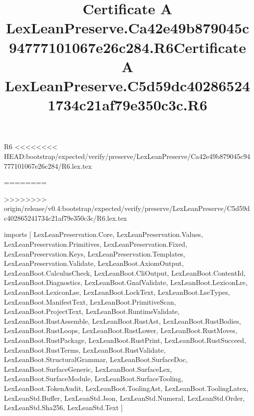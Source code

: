 \begin{lexlean}{R6}
<<<<<<<< HEAD:bootstrap/expected/verify/preserve/LexLeanPreserve/Ca42e49b879045c94777101067e26c284/R6.lex.tex
\title{Certificate A LexLeanPreserve.Ca42e49b879045c94777101067e26c284.R6}
========
\title{Certificate A LexLeanPreserve.C5d59dc402865241734c21af79e350c3c.R6}
>>>>>>>> origin/release/v0.4:bootstrap/expected/verify/preserve/LexLeanPreserve/C5d59dc402865241734c21af79e350c3c/R6.lex.tex
\begin{coremodule}
imports [
  LexLeanPreservation.Core,
  LexLeanPreservation.Values,
  LexLeanPreservation.Primitives,
  LexLeanPreservation.Fixed,
  LexLeanPreservation.Keys,
  LexLeanPreservation.Templates,
  LexLeanPreservation.Validate,
  LexLeanBoot.AxiomOutput,
  LexLeanBoot.CalculusCheck,
  LexLeanBoot.CliOutput,
  LexLeanBoot.ContentId,
  LexLeanBoot.Diagnostics,
  LexLeanBoot.GnafValidate,
  LexLeanBoot.LexiconLre,
  LexLeanBoot.LexiconLse,
  LexLeanBoot.LockText,
  LexLeanBoot.LseTypes,
  LexLeanBoot.ManifestText,
  LexLeanBoot.PrimitiveScan,
  LexLeanBoot.ProjectText,
  LexLeanBoot.RuntimeValidate,
  LexLeanBoot.RustAssemble,
  LexLeanBoot.RustAst,
  LexLeanBoot.RustBodies,
  LexLeanBoot.RustLoops,
  LexLeanBoot.RustLower,
  LexLeanBoot.RustMoves,
  LexLeanBoot.RustPackage,
  LexLeanBoot.RustPrint,
  LexLeanBoot.RustSucceed,
  LexLeanBoot.RustTerms,
  LexLeanBoot.RustValidate,
  LexLeanBoot.StructuralGrammar,
  LexLeanBoot.SurfaceDoc,
  LexLeanBoot.SurfaceGeneric,
  LexLeanBoot.SurfaceLex,
  LexLeanBoot.SurfaceModule,
  LexLeanBoot.SurfaceTooling,
  LexLeanBoot.TokenAudit,
  LexLeanBoot.ToolingAst,
  LexLeanBoot.ToolingLatex,
  LexLeanStd.Buffer,
  LexLeanStd.Json,
  LexLeanStd.Numeral,
  LexLeanStd.Order,
  LexLeanStd.Sha256,
  LexLeanStd.Text
]


\end{coremodule}
\end{lexlean}
